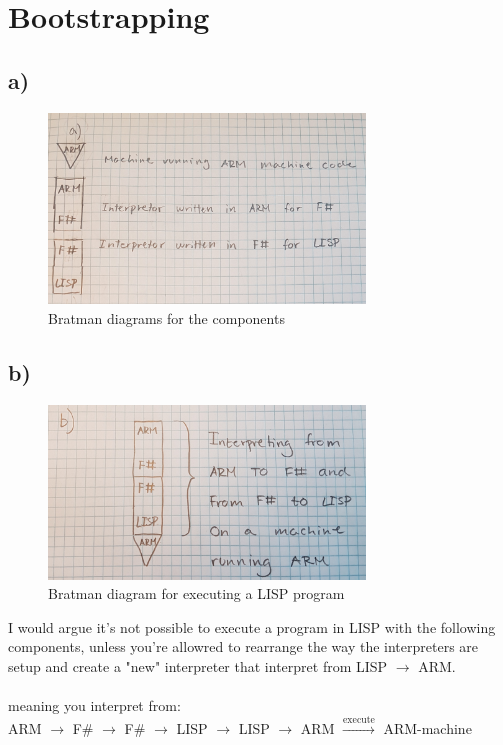 \section{Bootstrapping}

\subsection{a)}
\begin{figure}[H]
    \centering
    \includegraphics[width=0.75\textwidth]{Figures/PLD_A1_Q3_A_cropped.jpg}
    \caption{Bratman diagrams for the components}
\end{figure}

\subsection{b)}

\begin{figure}[H]
    \centering
    \includegraphics[width=0.75\textwidth]{Figures/PLD_A1_Q3_B_cropped.jpg}
    \caption{Bratman diagram for executing a LISP program}
\end{figure}

I would argue it's not possible to execute a program in LISP with the following components, unless you're allowred to rearrange the way the
interpreters are setup and create a "new" interpreter that interpret from LISP $\rightarrow$ ARM.
\\
\\
meaning you interpret from:
\\
ARM $\rightarrow$ F\# $\rightarrow$ F\# $\rightarrow$ LISP $\rightarrow$ LISP $\rightarrow$ ARM $\xrightarrow[]{\text{execute}}$ ARM-machine 